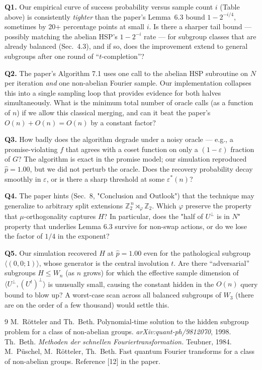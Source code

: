 \documentclass[11pt]{article}
\begin{document}
\textbf{Q1.} Our empirical curve of success probability versus sample
count $i$ (Table above) is consistently \emph{tighter} than the paper's
Lemma~6.3 bound $1 - 2^{-i/4}$, sometimes by 20+ percentage points at
small $i$. Is there a sharper tail bound --- possibly matching the
abelian HSP's $1 - 2^{-i}$ rate --- for subgroup classes that are
already balanced (Sec.\ 4.3), and if so, does the improvement extend to
general subgroups after one round of ``$t$-completion''?

\textbf{Q2.} The paper's Algorithm 7.1 uses one call to the abelian HSP
subroutine on $N$ per iteration \emph{and} one non-abelian Fourier
sample. Our implementation collapses this into a single sampling loop
that provides evidence for both halves simultaneously. What is the
minimum total number of oracle calls (as a function of $n$) if we allow
this classical merging, and can it beat the paper's $O(n) + O(n) = O(n)$
by a constant factor?

\textbf{Q3.} How badly does the algorithm degrade under a noisy oracle
--- e.g., a promise-violating $f$ that agrees with a coset function on
only a $(1-\varepsilon)$ fraction of $G$? The algorithm is exact in the
promise model; our simulation reproduced $\hat p = 1.00$, but we did
not perturb the oracle. Does the recovery probability decay smoothly
in $\varepsilon$, or is there a sharp threshold at some
$\varepsilon^*(n)$?

\textbf{Q4.} The paper hints (Sec.~8, "Conclusion and Outlook") that
the technique may generalize to arbitrary split extensions
$\mathbb Z_2^{\,n} \rtimes_\varphi \mathbb Z_2$. Which $\varphi$
preserve the property that $\mu$-orthogonality captures $H$? In
particular, does the "half of $U^{\perp}$ is in $N$" property that
underlies Lemma 6.3 survive for non-swap actions, or do we lose the
factor of $1/4$ in the exponent?

\textbf{Q5.} Our simulation recovered $H$ at $\hat p = 1.00$ even for
the pathological subgroup $\langle (0,0;1)\rangle$, whose generator is
the central involution $t$. Are there ``adversarial'' subgroups
$H \le W_n$ (as $n$ grows) for which the effective sample dimension of
$\langle U^{\perp}, (U^t)^{\perp}\rangle$ is unusually small, causing
the constant hidden in the $O(n)$ query bound to blow up? A worst-case
scan across all balanced subgroups of $W_3$ (there are on the order of
a few thousand) would settle this.


\begin{thebibliography}{9}
 M.\ R\"otteler and Th.\ Beth. Polynomial-time solution to the
hidden subgroup problem for a class of non-abelian groups.
\emph{arXiv:quant-ph/9812070}, 1998.
 Th.\ Beth. \emph{Methoden der schnellen Fouriertransformation.}
Teubner, 1984.
 M.\ P\"uschel, M.\ R\"otteler, Th.\ Beth. Fast quantum
Fourier transforms for a class of non-abelian groups. Reference [12]
in the paper.
\end{thebibliography}
\end{document}
